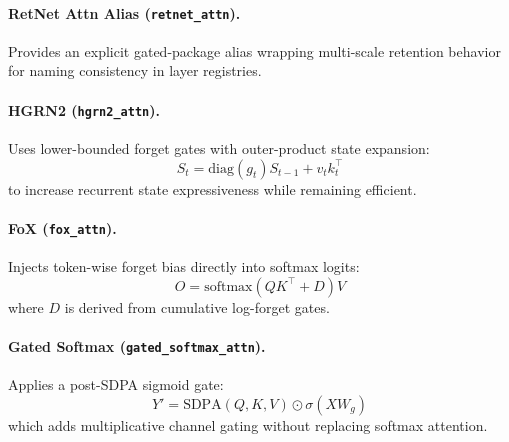 \documentclass[11pt,a4paper]{article}
\begin{document}
\paragraph{RetNet Attn Alias (\texttt{retnet\_attn}).}
Provides an explicit gated-package alias wrapping multi-scale retention behavior for naming consistency in layer registries.
\citep{sun_retentive_2023}

\paragraph{HGRN2 (\texttt{hgrn2\_attn}).}
Uses lower-bounded forget gates with outer-product state expansion:
\[
S_t=\text{diag}(g_t)S_{t-1}+v_tk_t^\top
\]
to increase recurrent state expressiveness while remaining efficient.
\citep{qin_hgrn2_2024}

\paragraph{FoX (\texttt{fox\_attn}).}
Injects token-wise forget bias directly into softmax logits:
\[
O=\text{softmax}(QK^\top + D)V
\]
where $D$ is derived from cumulative log-forget gates.
\citep{lin_forgetting_transformer_2025}

\paragraph{Gated Softmax (\texttt{gated\_softmax\_attn}).}
Applies a post-SDPA sigmoid gate:
\[
Y'=\text{SDPA}(Q,K,V)\odot \sigma(XW_g)
\]
which adds multiplicative channel gating without replacing softmax attention.
\citep{qiu_gated_attention_2025}
\end{document}
